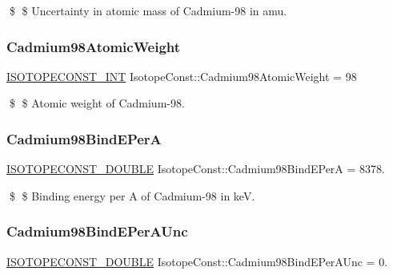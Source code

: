 \$ \$ Uncertainty in atomic mass of Cadmium-\/98 in amu. \mbox{\label{group___isotope_const-_cadmium-_cd98_ga1e2159e59be8d2d829aab4393871b458}} 
\subsubsection{\texorpdfstring{Cadmium98\+Atomic\+Weight}{Cadmium98AtomicWeight}}
{\footnotesize\ttfamily \mbox{\hyperlink{group___isotope_const-_macros_ga5f18360b3e99483a35c32d789e62621c}{I\+S\+O\+T\+O\+P\+E\+C\+O\+N\+S\+T\+\_\+\+I\+NT}} Isotope\+Const\+::\+Cadmium98\+Atomic\+Weight = 98}

\$ \$ Atomic weight of Cadmium-\/98. \mbox{\label{group___isotope_const-_cadmium-_cd98_gaa3156b0f722aa3276bad0ff11da3bee6}} 
\subsubsection{\texorpdfstring{Cadmium98\+Bind\+E\+PerA}{Cadmium98BindEPerA}}
{\footnotesize\ttfamily \mbox{\hyperlink{group___isotope_const-_macros_ga8f45a7272ce02c0b4c65c44636ed719a}{I\+S\+O\+T\+O\+P\+E\+C\+O\+N\+S\+T\+\_\+\+D\+O\+U\+B\+LE}} Isotope\+Const\+::\+Cadmium98\+Bind\+E\+PerA = 8378.}

\$ \$ Binding energy per A of Cadmium-\/98 in keV. \mbox{\label{group___isotope_const-_cadmium-_cd98_ga2713e1939c00e6023cb38ec78d66f307}} 
\subsubsection{\texorpdfstring{Cadmium98\+Bind\+E\+Per\+A\+Unc}{Cadmium98BindEPerAUnc}}
{\footnotesize\ttfamily \mbox{\hyperlink{group___isotope_const-_macros_ga8f45a7272ce02c0b4c65c44636ed719a}{I\+S\+O\+T\+O\+P\+E\+C\+O\+N\+S\+T\+\_\+\+D\+O\+U\+B\+LE}} Isotope\+Const\+::\+Cadmium98\+Bind\+E\+Per\+A\+Unc = 0.}

